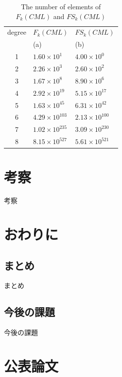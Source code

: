 \documentclass[12pt,dvipdfmx]{jreport}
\begin{document}
\begin{table}[tb]
  \begin{center}
  \caption{The number of elements of $F_{k}(CML)$ and $FS_{k}(CML)$}
  \label{tab:num_of_schemata_satisfied_srp}
  \begin{tabular}{c l l}
    \hline
    degree & $F_{k}(CML)$ &$FS_{k}(CML)$ \\
    & (a)&  (b)\\ 
    \hline
    \hline
    1 &  $1.60 \times 10^{1}$ & $4.00 \times 10^{0}$\\
    2 & $2.26 \times 10^{3}$ & $2.60 \times 10^{2}$  \\
    3 & $1.67 \times 10^{8}$ & $8.90 \times 10^{6}$\\
    4 & $2.92 \times 10^{19}$ & $5.15 \times 10^{17}$\\
    5 & $1.63 \times 10^{45}$ & $6.31 \times 10^{42}$\\
    6 & $4.29 \times 10^{103}$ & $2.13 \times 10^{100}$\\
    7 & $1.02 \times 10^{235}$ & $3.09 \times 10^{230}$\\
    8 & $8.15 \times 10^{527}$ & $5.61 \times 10^{521}$\\ 
    \hline
  \end{tabular}
  \end{center}
\end{table}




\chapter{考察}
考察

\chapter{おわりに}
 \section{まとめ}
 まとめ

 \section{今後の課題}
 今後の課題


\chapter*{公表論文}
\end{document}
